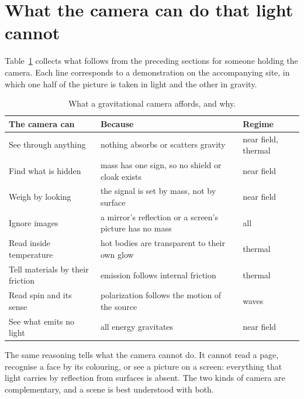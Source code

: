 \section{What the camera can do that light cannot}\label{sec:affordances}

Table~\ref{tab:affordances} collects what follows from the preceding sections
for someone holding the camera. Each line corresponds to a demonstration on
the accompanying site, in which one half of the picture is taken in light and
the other in gravity.

\begin{table}
\begin{tabular}{lll}
The camera can & Because & Regime \\ \hline
See through anything & nothing absorbs or scatters gravity & near field, thermal \\
Find what is hidden & mass has one sign, so no shield or cloak exists & near field \\
Weigh by looking & the signal is set by mass, not by surface & near field \\
Ignore images & a mirror's reflection or a screen's picture has no mass & all \\
Read inside temperature & hot bodies are transparent to their own glow & thermal \\
Tell materials by their friction & emission follows internal friction & thermal \\
Read spin and its sense & polarization follows the motion of the source & waves \\
See what emits no light & all energy gravitates & near field \\
\end{tabular}
\caption{What a gravitational camera affords, and why.}\label{tab:affordances}
\end{table}

The same reasoning tells what the camera cannot do. It cannot read a page,
recognise a face by its colouring, or see a picture on a screen: everything
that light carries by reflection from surfaces is absent. The two kinds of
camera are complementary, and a scene is best understood with both.
